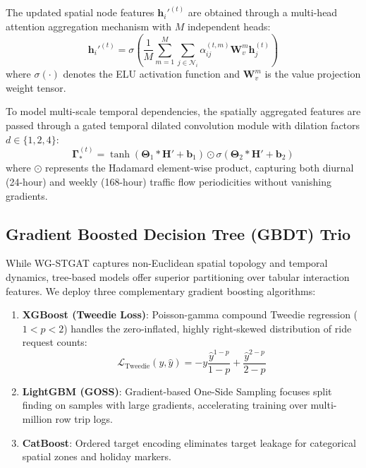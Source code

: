 \documentclass[10pt,journal,compsoc]{IEEEtran}
\begin{document}
The updated spatial node features $\mathbf{h}_i'^{(t)}$ are obtained through a multi-head attention aggregation mechanism with $M$ independent heads:
\begin{equation}
\mathbf{h}_i'^{(t)} = \sigma \left( \frac{1}{M} \sum_{m=1}^M \sum_{j \in \mathcal{N}_i} \alpha_{ij}^{(t, m)} \mathbf{W}_v^m \mathbf{h}_j^{(t)} \right)
\end{equation}
where $\sigma(\cdot)$ denotes the ELU activation function and $\mathbf{W}_v^m$ is the value projection weight tensor.

To model multi-scale temporal dependencies, the spatially aggregated features are passed through a gated temporal dilated convolution module with dilation factors $d \in \{1, 2, 4\}$:
\begin{equation}
\mathbf{\Gamma}_*^{(t)} = \tanh\left( \mathbf{\Theta}_1 * \mathbf{H}' + \mathbf{b}_1 \right) \odot \sigma\left( \mathbf{\Theta}_2 * \mathbf{H}' + \mathbf{b}_2 \right)
\end{equation}
where $\odot$ represents the Hadamard element-wise product, capturing both diurnal (24-hour) and weekly (168-hour) traffic flow periodicities without vanishing gradients.

\subsection{Gradient Boosted Decision Tree (GBDT) Trio}
While WG-STGAT captures non-Euclidean spatial topology and temporal dynamics, tree-based models offer superior partitioning over tabular interaction features. We deploy three complementary gradient boosting algorithms:
\begin{enumerate}
    \item \textbf{XGBoost (Tweedie Loss)}: Poisson-gamma compound Tweedie regression ($1 < p < 2$) handles the zero-inflated, highly right-skewed distribution of ride request counts:
    \begin{equation}
    \mathcal{L}_{\text{Tweedie}}(y, \hat{y}) = -y \frac{\hat{y}^{1-p}}{1-p} + \frac{\hat{y}^{2-p}}{2-p}
    \end{equation}
    \item \textbf{LightGBM (GOSS)}: Gradient-based One-Side Sampling focuses split finding on samples with large gradients, accelerating training over multi-million row trip logs.
    \item \textbf{CatBoost}: Ordered target encoding eliminates target leakage for categorical spatial zones and holiday markers.
\end{enumerate}
\end{document}
